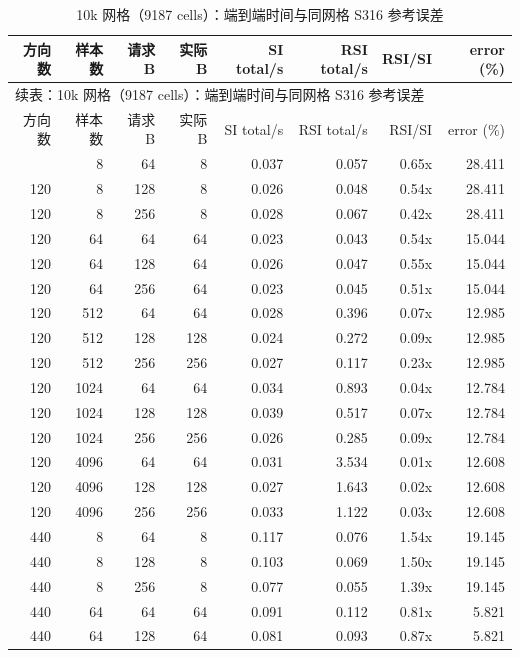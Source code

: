 {\tiny\setlength{\tabcolsep}{2.3pt}
\begin{longtable}{rrrrrrrr}
\caption{10k 网格（9187 cells）：端到端时间与同网格 S316 参考误差}\label{tab:factor-time-10k}\\
\toprule
方向数 & 样本数 & 请求 B & 实际 B & SI total/s & RSI total/s & RSI/SI & error (\%)\\
\midrule
\endfirsthead
\multicolumn{8}{l}{\small 续表：10k 网格（9187 cells）：端到端时间与同网格 S316 参考误差}\\
\toprule
方向数 & 样本数 & 请求 B & 实际 B & SI total/s & RSI total/s & RSI/SI & error (\%)\\
\midrule
\endhead
\bottomrule
\endfoot
120 & 8 & 64 & 8 & 0.037 & 0.057 & 0.65x & 28.411\\
120 & 8 & 128 & 8 & 0.026 & 0.048 & 0.54x & 28.411\\
120 & 8 & 256 & 8 & 0.028 & 0.067 & 0.42x & 28.411\\
120 & 64 & 64 & 64 & 0.023 & 0.043 & 0.54x & 15.044\\
120 & 64 & 128 & 64 & 0.026 & 0.047 & 0.55x & 15.044\\
120 & 64 & 256 & 64 & 0.023 & 0.045 & 0.51x & 15.044\\
120 & 512 & 64 & 64 & 0.028 & 0.396 & 0.07x & 12.985\\
120 & 512 & 128 & 128 & 0.024 & 0.272 & 0.09x & 12.985\\
120 & 512 & 256 & 256 & 0.027 & 0.117 & 0.23x & 12.985\\
120 & 1024 & 64 & 64 & 0.034 & 0.893 & 0.04x & 12.784\\
120 & 1024 & 128 & 128 & 0.039 & 0.517 & 0.07x & 12.784\\
120 & 1024 & 256 & 256 & 0.026 & 0.285 & 0.09x & 12.784\\
120 & 4096 & 64 & 64 & 0.031 & 3.534 & 0.01x & 12.608\\
120 & 4096 & 128 & 128 & 0.027 & 1.643 & 0.02x & 12.608\\
120 & 4096 & 256 & 256 & 0.033 & 1.122 & 0.03x & 12.608\\
440 & 8 & 64 & 8 & 0.117 & 0.076 & 1.54x & 19.145\\
440 & 8 & 128 & 8 & 0.103 & 0.069 & 1.50x & 19.145\\
440 & 8 & 256 & 8 & 0.077 & 0.055 & 1.39x & 19.145\\
440 & 64 & 64 & 64 & 0.091 & 0.112 & 0.81x & 5.821\\
440 & 64 & 128 & 64 & 0.081 & 0.093 & 0.87x & 5.821\\

\end{longtable}}
